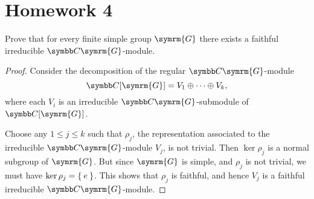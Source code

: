 \section*{Homework 4}

\begin{exercise}
Prove that for every finite simple group \(\symrm{G}\) there exists a faithful irreducible \(\complex \symrm{G}\)-module.
\end{exercise}
\begin{proof}
Consider the decomposition of the regular \(\complex \symrm{G}\)-module
\[
    \complex[\symrm{G}] = V_1 \oplus \dots \oplus V_k,
\]
where each \(V_i\) is an irreducible \(\complex \symrm{G}\)-submodule of \(\complex[\symrm{G}]\).

Choose any \(1 \leq j \leq k\) such that \(\rho_j\), the representation associated to the irreducible \(\complex \symrm{G}\)-module \(V_j\), is not trivial. Then \(\ker \rho_j\) is a normal subgroup of \(\symrm{G}\). But since \(\symrm{G}\) is simple, and \(\rho_j\) is not trivial, we must have \(\ker \rho_j = \Set{e}\). This shows that \(\rho_j\) is faithful, and hence \(V_j\) is a faithful irreducible \(\complex \symrm{G}\)-module.
\end{proof}

